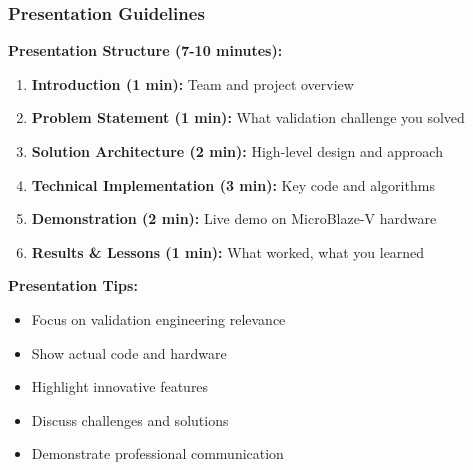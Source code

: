 \documentclass{beamer}
\begin{document}
\begin{frame}
\frametitle{Presentation Guidelines}
\textbf{Presentation Structure (7-10 minutes):}
\begin{enumerate}
    \item \textbf{Introduction (1 min):} Team and project overview
    \item \textbf{Problem Statement (1 min):} What validation challenge you solved
    \item \textbf{Solution Architecture (2 min):} High-level design and approach
    \item \textbf{Technical Implementation (3 min):} Key code and algorithms
    \item \textbf{Demonstration (2 min):} Live demo on MicroBlaze-V hardware
    \item \textbf{Results \& Lessons (1 min):} What worked, what you learned
\end{enumerate}

\vspace{0.5cm}
\textbf{Presentation Tips:}
\begin{itemize}
    \item Focus on validation engineering relevance
    \item Show actual code and hardware
    \item Highlight innovative features
    \item Discuss challenges and solutions
    \item Demonstrate professional communication
\end{itemize}
\end{frame}
\end{document}
